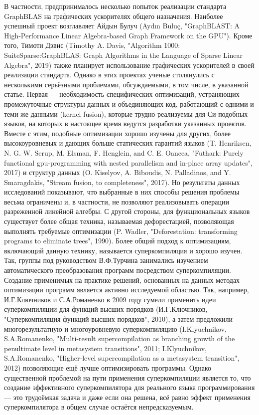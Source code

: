 \documentclass[12pt]{article}  %
\theoremstyle{remark}
\begin{document}
В частности, предпринималось несколько попыток реализации стандарта GraphBLAS на графических ускорителях общего назначения. Наиболее успешный проект возглавляет Айдын Булуч (Aydın Buluç, "GraphBLAST: A High-Performance Linear Algebra-based Graph Framework on the GPU"). Кроме того, Тимоти Дэвис (Timothy A. Davis, "Algorithm 1000: SuiteSparse:GraphBLAS: Graph Algorithms in the Language of Sparse Linear Algebra", 2019) также планирует использование графических ускорителей в своей реализации стандарта. Однако в этих проектах ученые  столкнулись с несколькими серьёзными проблемами, обсуждаемыми, в том числе, в указанной статье. Первая --- необходимость специфических оптимизаций, устраняющих промежуточные структуры данных и объединяющих код, работающий с одними и теми же данными (kernel fusion), которые трудно реализуемы для Си-подобных языков, на которых в настоящее время ведутся разработки указанных проектов. Вместе с этим, подобные оптимизации хорошо изучены для других, более высокоуровневых и дающих больше статических гарантий языков (T. Henriksen, N. G. W. Serup, M. Elsman, F. Henglein, and C. E. Oancea, "Futhark: Purely functional gpu-programming with nested parallelism and in-place array updates", 2017) и структур данных (O. Kiselyov, A. Biboudis, N. Palladinos, and Y. Smaragdakis, "Stream fusion, to completeness", 2017). Но результаты данных исследований показывают, что выбранные в них способы решения проблемы весьма ограничены и, в частности, не позволяют реализовывать операции разреженной линейной алгебры. С другой стороны, для функциональных языков существует более общая техника, называемая дефорестацией, позволяющая выполнять требуемые оптимизации (P. Wadler, "Deforestation: transforming programs to eliminate trees", 1990). Более общий подход к оптимизациям, включающий данную технику, называется суперкомпиляция и хорошо изучен. Так, группы под руководством В.Ф.Турчина занимались изучением автоматического преобразования программ посредством суперкомпиляции. Создание применимых на практике решений, основанных на данных методах оптимизации программ является активно исследуемой областью. Так, например, И.Г.Ключников и С.А.Романенко в 2009 году сумели применить идеи суперкомпиляции для функций высших порядков (И.Г.Ключников, "Суперкомпиляция функций высших порядков", 2010), а затем предложили многорезультатную и многоуровневую суперкомпиляцию (I.Klyuchnikov, S.A.Romanenko, "Multi-result supercompilation as branching growth of the penultimate level in metasystem transitions", 2011; I.Klyuchnikov, S.A.Romanenko, "Higher-level supercompilation as a metasystem transition", 2012) позволяющие ещё лучше оптимизировать программы. Однако существенной проблемой на пути применения суперкомпиляции является то, что создание эффективного суперкомпилятора для реального языка программирования --- это трудоёмкая задача и даже если она решена, всё равно эффект применения суперкомпилятора в общем случае остаётся непредсказуемым. 
\end{document}
